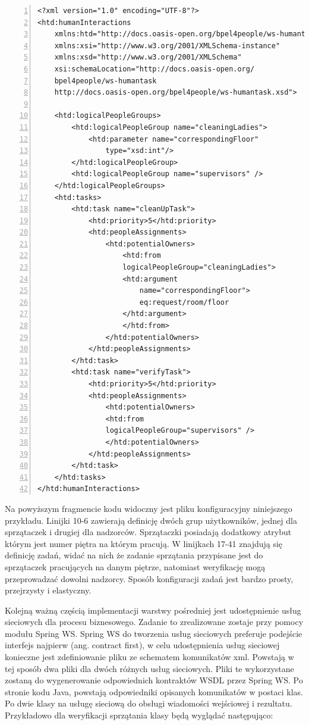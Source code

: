 \begin{lstlisting}[caption=Plik konfiguracyjny z opisem zadań warstwy pośredniej.,numbers=left]
<?xml version="1.0" encoding="UTF-8"?>
<htd:humanInteractions
	xmlns:htd="http://docs.oasis-open.org/bpel4people/ws-humantask"
	xmlns:xsi="http://www.w3.org/2001/XMLSchema-instance"
	xmlns:xsd="http://www.w3.org/2001/XMLSchema"
	xsi:schemaLocation="http://docs.oasis-open.org/
	bpel4people/ws-humantask 
	http://docs.oasis-open.org/bpel4people/ws-humantask.xsd">

	<htd:logicalPeopleGroups>
		<htd:logicalPeopleGroup name="cleaningLadies">
			<htd:parameter name="correspondingFloor"
				type="xsd:int"/>
		</htd:logicalPeopleGroup>
		<htd:logicalPeopleGroup name="supervisors" />
	</htd:logicalPeopleGroups>
	<htd:tasks>
		<htd:task name="cleanUpTask">
			<htd:priority>5</htd:priority>
			<htd:peopleAssignments>
				<htd:potentialOwners>
					<htd:from 
					logicalPeopleGroup="cleaningLadies">
					<htd:argument 
						name="correspondingFloor">
						eq:request/room/floor
					</htd:argument>
					</htd:from>
				</htd:potentialOwners>
			</htd:peopleAssignments>
		</htd:task>
		<htd:task name="verifyTask">
			<htd:priority>5</htd:priority>
			<htd:peopleAssignments>
				<htd:potentialOwners>
				<htd:from
				logicalPeopleGroup="supervisors" />
				</htd:potentialOwners>
			</htd:peopleAssignments>
		</htd:task>
	</htd:tasks>
</htd:humanInteractions>
\end{lstlisting}

Na powyższym fragmencie kodu widoczny jest pliku konfiguracyjny niniejszego przykładu. Linijki 10-6 zawierają definicję dwóch grup użytkowników, jednej dla sprzątaczek i drugiej dla nadzorców. Sprzątaczki posiadają dodatkowy atrybut którym jest numer piętra na którym pracują. W linijkach 17-41 znajdują się definicję zadań, widać na nich że zadanie sprzątania przypisane jest do sprzątaczek pracujących na danym piętrze, natomiast weryfikację mogą przeprowadzać dowolni nadzorcy. Sposób konfiguracji zadań jest bardzo prosty, przejrzysty i elastyczny. 

Kolejną ważną częścią implementacji warstwy pośredniej jest udostępnienie usług sieciowych dla procesu biznesowego. Zadanie to zrealizowane zostaje przy pomocy modułu Spring WS. Spring WS do tworzenia usług sieciowych preferuje podejście interfejs najpierw (ang. contract first), w celu udostępnienia usług sieciowej konieczne jest zdefiniowanie pliku ze schematem komunikatów xml. Powstają w tej sposób dwa pliki dla dwóch różnych usług sieciowych. Pliki te wykorzystane zostaną do wygenerowanie odpowiednich kontraktów WSDL przez Spring WS. Po stronie kodu Java, powstają odpowiedniki opisanych komunikatów w postaci klas. Po dwie klasy na usługę sieciową do obsługi wiadomości wejściowej i rezultatu. Przykładowo dla weryfikacji sprzątania klasy będą wyglądać następująco: 

